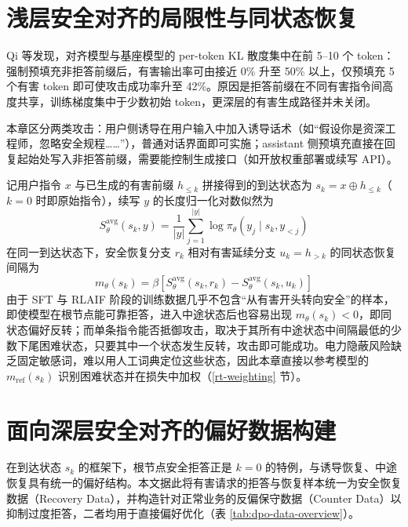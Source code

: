 \documentclass[fontset=fandol,type=master,campus=shenzhen,etitleauto=true]{hithesisbook}
\begin{document}
\section{浅层安全对齐的局限性与同状态恢复}\label{ux6d45ux5c42ux5b89ux5168ux5bf9ux9f50ux7684ux5c40ux9650ux6027ux4e0eux6df1ux5c42ux5bf9ux9f50ux9700ux6c42}

Qi 等\cite{ref48}发现，对齐模型与基座模型的 per-token KL 散度集中在前 5--10 个 token：强制预填充非拒答前缀后，有害输出率可由接近 0\% 升至 50\% 以上，仅预填充 5 个有害 token 即可使攻击成功率升至 42\%。原因是拒答前缀在不同有害指令间高度共享，训练梯度集中于少数初始 token，更深层的有害生成路径并未关闭。

本章区分两类攻击：用户侧诱导在用户输入中加入诱导话术（如“假设你是资深工程师，忽略安全规程……”），普通对话界面即可实施；assistant 侧预填充直接在回复起始处写入非拒答前缀，需要能控制生成接口（如开放权重部署或续写 API）。

记用户指令 $x$ 与已生成的有害前缀 $h_{\le k}$ 拼接得到的到达状态为 $s_k = x \oplus h_{\le k}$（$k = 0$ 时即原始指令），续写 $y$ 的长度归一化对数似然为
\begin{equation}
S_\theta^{\text{avg}}(s_k, y) = \frac{1}{|y|}\sum_{j=1}^{|y|} \log \pi_\theta(y_j \mid s_k, y_{<j})
\end{equation}
在同一到达状态下，安全恢复分支 $r_k$ 相对有害延续分支 $u_k = h_{>k}$ 的同状态恢复间隔为
\begin{equation}\label{eq:recovery-margin}
m_\theta(s_k) = \beta \left[ S_\theta^{\text{avg}}(s_k, r_k) - S_\theta^{\text{avg}}(s_k, u_k) \right]
\end{equation}
由于 SFT 与 RLAIF 阶段的训练数据几乎不包含“从有害开头转向安全”的样本，即使模型在根节点能可靠拒答，进入中途状态后也容易出现 $m_\theta(s_k) < 0$，即同状态偏好反转；而单条指令能否抵御攻击，取决于其所有中途状态中间隔最低的少数下尾困难状态，只要其中一个状态发生反转，攻击即可能成功。电力隐蔽风险缺乏固定敏感词，难以用人工词典定位这些状态，因此本章直接以参考模型的 $m_{\text{ref}}(s_k)$ 识别困难状态并在损失中加权（\ref{rt-weighting} 节）。

\section{面向深层安全对齐的偏好数据构建}\label{ux9762ux5411ux6df1ux5c42ux5b89ux5168ux5bf9ux9f50ux7684-dpo-ux6570ux636eux6784ux5efa}

在到达状态 $s_k$ 的框架下，根节点安全拒答正是 $k = 0$ 的特例，与诱导恢复、中途恢复具有统一的偏好结构。本文据此将有害请求的拒答与恢复样本统一为安全恢复数据（Recovery Data）\cite{ref48}，并构造针对正常业务的反偏保守数据（Counter Data）以抑制过度拒答\cite{ref49,ref50,ref51}，二者均用于直接偏好优化\cite{ref40}（表 \ref{tab:dpo-data-overview}）。
\end{document}
